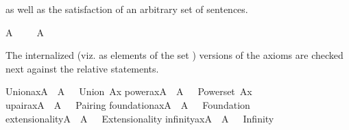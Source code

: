 as well as the satisfaction of an arbitrary set of sentences.%
\begin{isabelle}%
A\ {\isasymTurnstile}\ {\isasymPhi}\ {\isasymequiv}\ {\isasymforall}{\isasymphi}{\isasymin}{\isasymPhi}{\isachardot}{\kern0pt}\ A{\isacharcomma}{\kern0pt}\ {\isacharbrackleft}{\kern0pt}{\isacharbrackright}{\kern0pt}\ {\isasymTurnstile}\ {\isasymphi}%
\end{isabelle}%
The internalized (viz. as elements of the set )
versions of the axioms are checked next against the relative statements.%
\begin{isabelle}%
Union{\isacharunderscore}{\kern0pt}ax{\isacharparenleft}{\kern0pt}{\isacharhash}{\kern0pt}{\isacharhash}{\kern0pt}A{\isacharparenright}{\kern0pt}\ {\isasymlongleftrightarrow}\ A{\isacharcomma}{\kern0pt}\ {\isacharbrackleft}{\kern0pt}{\isacharbrackright}{\kern0pt}\ {\isasymTurnstile}\ {\isasymcdot}Union\ Ax{\isasymcdot}\isasep\isanewline%
power{\isacharunderscore}{\kern0pt}ax{\isacharparenleft}{\kern0pt}{\isacharhash}{\kern0pt}{\isacharhash}{\kern0pt}A{\isacharparenright}{\kern0pt}\ {\isasymlongleftrightarrow}\ A{\isacharcomma}{\kern0pt}\ {\isacharbrackleft}{\kern0pt}{\isacharbrackright}{\kern0pt}\ {\isasymTurnstile}\ {\isasymcdot}Powerset\ Ax{\isasymcdot}\isasep\isanewline%
upair{\isacharunderscore}{\kern0pt}ax{\isacharparenleft}{\kern0pt}{\isacharhash}{\kern0pt}{\isacharhash}{\kern0pt}A{\isacharparenright}{\kern0pt}\ {\isasymlongleftrightarrow}\ A{\isacharcomma}{\kern0pt}\ {\isacharbrackleft}{\kern0pt}{\isacharbrackright}{\kern0pt}\ {\isasymTurnstile}\ {\isasymcdot}Pairing{\isasymcdot}\isasep\isanewline%
foundation{\isacharunderscore}{\kern0pt}ax{\isacharparenleft}{\kern0pt}{\isacharhash}{\kern0pt}{\isacharhash}{\kern0pt}A{\isacharparenright}{\kern0pt}\ {\isasymlongleftrightarrow}\ A{\isacharcomma}{\kern0pt}\ {\isacharbrackleft}{\kern0pt}{\isacharbrackright}{\kern0pt}\ {\isasymTurnstile}\ {\isasymcdot}Foundation{\isasymcdot}\isasep\isanewline%
extensionality{\isacharparenleft}{\kern0pt}{\isacharhash}{\kern0pt}{\isacharhash}{\kern0pt}A{\isacharparenright}{\kern0pt}\ {\isasymlongleftrightarrow}\ A{\isacharcomma}{\kern0pt}\ {\isacharbrackleft}{\kern0pt}{\isacharbrackright}{\kern0pt}\ {\isasymTurnstile}\ {\isasymcdot}Extensionality{\isasymcdot}\isasep\isanewline%
infinity{\isacharunderscore}{\kern0pt}ax{\isacharparenleft}{\kern0pt}{\isacharhash}{\kern0pt}{\isacharhash}{\kern0pt}A{\isacharparenright}{\kern0pt}\ {\isasymlongleftrightarrow}\ A{\isacharcomma}{\kern0pt}\ {\isacharbrackleft}{\kern0pt}{\isacharbrackright}{\kern0pt}\ {\isasymTurnstile}\ {\isasymcdot}Infinity{\isasymcdot}\isasep\isanewline\isanewline%

\end{isabelle}
